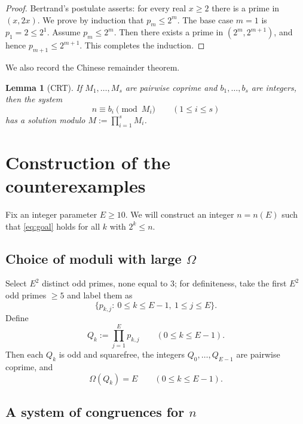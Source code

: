 \documentclass[11pt]{article}
\newtheorem{lemma}{Lemma}
\numberwithin{equation}{section}
\begin{document}
\begin{proof}
Bertrand's postulate asserts: for every real $x\ge 2$ there is a prime in $(x,2x)$.
We prove by induction that $p_m\le 2^m$. The base case $m=1$ is $p_1=2\le 2^1$.
Assume $p_m\le 2^m$. Then there exists a prime in $(2^m,2^{m+1})$, and hence
$p_{m+1}\le 2^{m+1}$. This completes the induction.
\end{proof}

We also record the Chinese remainder theorem.

\begin{lemma}[CRT]\label{lem:crt}
If $M_1,\dots,M_s$ are pairwise coprime and $b_1,\dots,b_s$ are integers, then the system
\[
n\equiv b_i\pmod{M_i}\qquad(1\le i\le s)
\]
has a solution modulo $M:=\prod_{i=1}^s M_i$.
\end{lemma}

\section{Construction of the counterexamples}

Fix an integer parameter $E\ge 10$.
We will construct an integer $n=n(E)$ such that \eqref{eq:goal} holds for all $k$ with $2^k\le n$.

\subsection{Choice of moduli with large $\Omega$}

Select $E^2$ distinct odd primes, none equal to $3$; for definiteness, take the first $E^2$
odd primes $\ge 5$ and label them as
\[
\{p_{k,j}:\ 0\le k\le E-1,\ 1\le j\le E\}.
\]
Define
\begin{equation}\label{eq:Qk_def}
Q_k:=\prod_{j=1}^E p_{k,j}\qquad(0\le k\le E-1).
\end{equation}
Then each $Q_k$ is odd and squarefree, the integers $Q_0,\dots,Q_{E-1}$ are pairwise coprime,
and
\begin{equation}\label{eq:OmegaQk}
\Omega(Q_k)=E\qquad(0\le k\le E-1).
\end{equation}

\subsection{A system of congruences for $n$}
\end{document}
